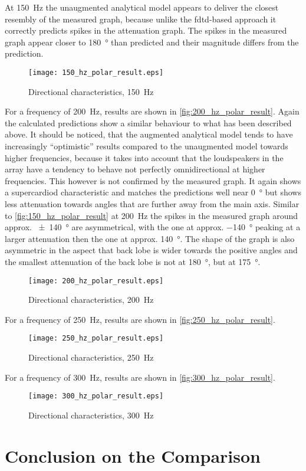 At \SI{150}{\hertz} the unaugmented analytical model appears to deliver the closest resembly of the measured graph, because unlike the \gls{fdtd}-based approach it correctly predicts spikes in the attenuation graph. The spikes in the measured graph appear closer to \SI{180}{\degree} than predicted and their magnitude differs from the prediction.
\begin{figure}[H]
	\centering
	\texttt{[image: 150\_hz\_polar\_result.eps]}
	\caption{Directional characteristics, \SI{150}{\hertz}}
		\label{fig:150_hz_polar_result}
\end{figure}
For a frequency of \SI{200}{\hertz}, results are shown in \autoref{fig:200_hz_polar_result}. Again the calculated predictions show a similar behaviour to what has been described above. It should be noticed, that the augmented analytical model tends to have increasingly ``optimistic'' results compared to the unaugmented model towards higher frequencies, because it takes into account that the loudspeakers in the array have a tendency to behave not perfectly omnidirectional at higher frequencies. This however is not confirmed by the measured graph. It again shows a supercardiod characteristic and matches the predictions well near \SI{0}{\degree} but shows less attenuation towards angles that are further away from the main axis. Similar to \autoref{fig:150_hz_polar_result} at \SI{200}{\hertz} the spikes in the measured graph around approx. \SI{\pm 140}{\degree} are asymmetrical, with the one at approx. \SI{-140}{\degree} peaking at a larger attenuation then the one at approx. \SI{140}{\degree}. The shape of the graph is also asymmetric in the aspect that back lobe is wider towards the positive angles and the smallest attenuation of the back lobe is not at \SI{180}{\degree}, but at \SI{175}{\degree}.
 \begin{figure}[H]
	\centering
	\texttt{[image: 200\_hz\_polar\_result.eps]}
	\caption{Directional characteristics, \SI{200}{\hertz}}
		\label{fig:200_hz_polar_result}
\end{figure}
For a frequency of \SI{250}{\hertz}, results are shown in \autoref{fig:250_hz_polar_result}.

 \begin{figure}[H]
	\centering
	\texttt{[image: 250\_hz\_polar\_result.eps]}
	\caption{Directional characteristics, \SI{250}{\hertz}}
		\label{fig:250_hz_polar_result}
\end{figure}
For a frequency of \SI{300}{\hertz}, results are shown in \autoref{fig:300_hz_polar_result}.
 \begin{figure}[H]
	\centering
	\texttt{[image: 300\_hz\_polar\_result.eps]}
	\caption{Directional characteristics, \SI{300}{\hertz}}
		\label{fig:300_hz_polar_result}
\end{figure}


\section{Conclusion on the Comparison}




